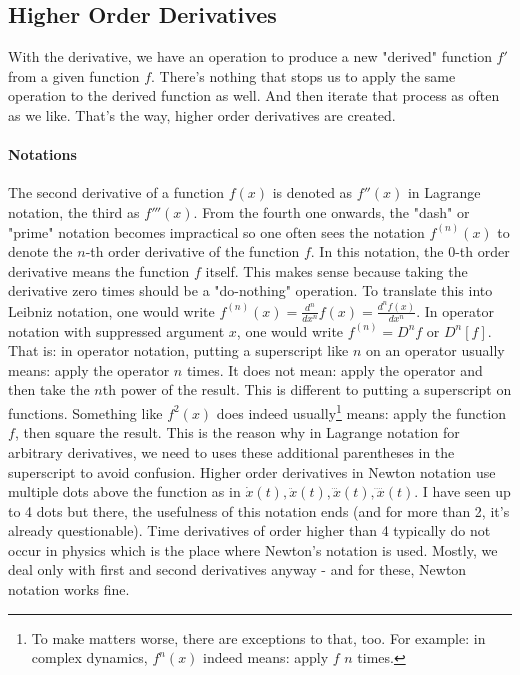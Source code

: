 

\subsection{Higher Order Derivatives}
With the derivative, we have an operation to produce a new "derived" function $f'$ from a given function $f$. There's nothing that stops us to apply the same operation to the derived function as well. And then iterate that process as often as we like. That's the way, higher order derivatives are created. 

\paragraph{Notations} The second derivative of a function $f(x)$ is denoted as $f''(x)$ in Lagrange notation, the third as $f'''(x)$. From the fourth one onwards, the "dash" or "prime" notation becomes impractical so one often sees the notation $f^{(n)}(x)$ to denote the $n$-th order derivative of the function $f$. In this notation, the $0$-th order derivative means the function $f$ itself. This makes sense because taking the derivative zero times should be a "do-nothing" operation. To translate this into Leibniz notation, one would write $f^{(n)}(x) = \frac{d^n}{d x^n} f(x) = \frac{d^n f(x)}{d x^n}$. In operator notation with suppressed argument $x$, one would write $f^{(n)} = D^n f$ or $D^n[f]$. That is: in operator notation, putting a superscript like $n$ on an operator usually means: apply the operator $n$ times. It does not mean: apply the operator and then take the $n$th power of the result. This is different to putting a superscript on functions. Something like $f^2(x)$ does indeed usually\footnote{To make matters worse, there are exceptions to that, too. For example: in complex dynamics, $f^n(x)$ indeed means: apply $f$ $n$ times.} means: apply the function $f$, then square the result. This is the reason why in Lagrange notation for arbitrary derivatives, we need to uses these additional parentheses in the superscript to avoid confusion. Higher order derivatives in Newton notation use multiple dots above the function as in $\dot{x}(t), \ddot{x}(t), \dddot{x}(t), \ddddot{x}(t)$. I have seen up to 4 dots but there, the usefulness of this notation ends (and for more than 2, it's already questionable). Time derivatives of order higher than 4 typically do not occur in physics which is the place where Newton's notation is used. Mostly, we deal only with first and second derivatives anyway - and for these, Newton notation works fine. 

